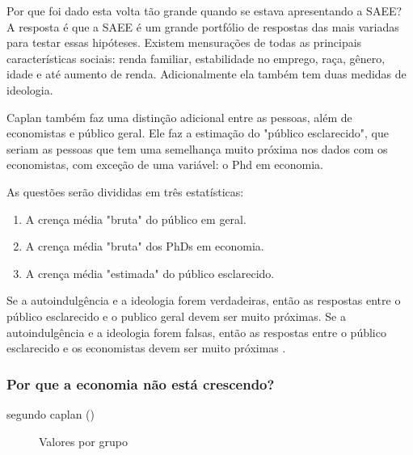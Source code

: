 Por que foi dado esta volta tão grande quando se estava apresentando a SAEE? A resposta é que a SAEE é um grande portfólio de respostas das mais variadas para testar essas hipóteses. Existem mensurações de todas as principais características sociais: renda familiar, estabilidade no emprego, raça, gênero, idade e até aumento de renda. Adicionalmente ela também tem duas medidas de ideologia.

Caplan também faz uma distinção adicional entre as pessoas, além de economistas e público geral. Ele faz a estimação do "público esclarecido", que seriam as pessoas que tem uma semelhança muito próxima nos dados com os economistas, com exceção de uma variável: o Phd em economia.

As questões serão divididas em três estatísticas:

\begin{enumerate}
    \item A crença média "bruta" do público em geral.
    \item A crença média "bruta" dos PhDs em economia.
    \item A crença média "estimada" do público esclarecido.
\end{enumerate}

Se a autoindulgência e a ideologia forem verdadeiras, então as respostas entre o público esclarecido e o publico geral devem ser muito próximas. Se a autoindulgência e a ideologia forem falsas, então as respostas entre o público esclarecido e os economistas devem ser muito próximas \cite{The_Myth_of_the_Rational_Voter}.

\subsubsection{Por que a economia não está crescendo?}

segundo caplan (\citeyear{The_Myth_of_the_Rational_Voter})

\begin{figure}[ht]
    \centering
    \caption{Valores por grupo}
    \label{fig:valores_grupo}
\end{figure}


